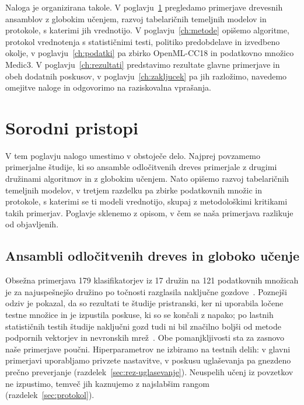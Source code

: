 \documentclass[a4paper,12pt,openright]{book}
\begin{document}
Naloga je organizirana takole. V poglavju~\ref{ch:sorodni} pregledamo
primerjave drevesnih ansamblov z globokim učenjem, razvoj tabelaričnih
temeljnih modelov in protokole, s katerimi jih vrednotijo. V
poglavju~\ref{ch:metode} opišemo algoritme, protokol vrednotenja s
statističnimi testi, politiko predobdelave in izvedbeno okolje, v
poglavju~\ref{ch:podatki} pa zbirko OpenML-CC18 in podatkovno množico Medic3. V
poglavju~\ref{ch:rezultati} predstavimo rezultate glavne primerjave in obeh
dodatnih poskusov, v poglavju~\ref{ch:zakljucek} pa jih razložimo, navedemo
omejitve naloge in odgovorimo na raziskovalna vprašanja.

\chapter{Sorodni pristopi}
\label{ch:sorodni}

V tem poglavju nalogo umestimo v obstoječe delo. Najprej povzamemo primerjalne
študije, ki so ansamble odločitvenih dreves primerjale z drugimi družinami
algoritmov in z globokim učenjem.
Nato opišemo razvoj tabelaričnih temeljnih modelov, v tretjem razdelku pa
zbirke podatkovnih množic in protokole, s katerimi se ti modeli vrednotijo,
skupaj z metodološkimi kritikami takih primerjav. Poglavje sklenemo z opisom,
v čem se naša primerjava razlikuje od objavljenih.

\section{Ansambli odločitvenih dreves in globoko učenje}
\label{sec:sor-drevesa}

Obsežna primerjava 179 klasifikatorjev iz 17 družin na 121 podatkovnih
množicah je za najuspešnejšo družino po točnosti
razglasila naključne gozdove~\cite{fernandez2014we}. Poznejši odziv je
pokazal, da so rezultati te študije pristranski, ker ni uporabila ločene
testne množice in je izpustila poskuse, ki so se končali z napako; po lastnih
statističnih testih študije naključni gozd tudi ni bil značilno boljši od
metode podpornih vektorjev in nevronskih mrež~\cite{wainberg2016random}. Obe
pomanjkljivosti sta za zasnovo naše primerjave poučni. Hiperparametrov ne
izbiramo na testnih delih: v glavni primerjavi uporabljamo privzete nastavitve,
v poskusu uglaševanja pa gnezdeno prečno preverjanje
(razdelek~\ref{sec:rez-uglasevanje}). Neuspelih učenj iz povzetkov ne
izpustimo, temveč jih kaznujemo z najslabšim rangom
(razdelek~\ref{sec:protokol}).
\end{document}
